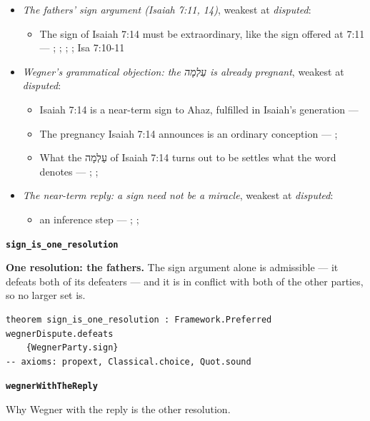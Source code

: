 \documentclass[11pt]{article}
\begin{document}
\begin{itemize}
\item \emph{The fathers' sign argument (Isaiah 7:11, 14)}, weakest at \emph{disputed}:
\begin{itemize}
\item The sign of Isaiah 7:14 must be extraordinary, like the sign offered at 7:11 --- \cite[I.35]{origen-against-celsus-248}; \cite[84]{justin-dialogue-with-trypho-160}; \cite[III.21.6]{irenaeus-against-heresies-180}; \cite[474]{postell-isaiah-messianic-2025}; Isa 7:10-11
\end{itemize}
\item \emph{Wegner's grammatical objection: the עַלְמָה is already pregnant}, weakest at \emph{disputed}:
\begin{itemize}
\item Isaiah 7:14 is a near-term sign to Ahaz, fulfilled in Isaiah's generation --- \cite{brown-birth-messiah-1993}
\item The pregnancy Isaiah 7:14 announces is an ordinary conception --- \cite[476--478]{wegner-virgin-births-2011}; \cite[474]{postell-isaiah-messianic-2025}
\item What the עַלְמָה of Isaiah 7:14 turns out to be settles what the word denotes --- \cite[471--472]{wegner-virgin-births-2011}; \cite[468]{postell-isaiah-messianic-2025}; \cite[152]{rico-gentry-infant-king-2020}
\end{itemize}
\item \emph{The near-term reply: a sign need not be a miracle}, weakest at \emph{disputed}:
\begin{itemize}
\item an inference step --- \cite[64--65]{rhodea-did-matthew-conceive-2013}; \cite[469--470]{wegner-virgin-births-2011}; \cite[474]{postell-isaiah-messianic-2025}
\end{itemize}
\end{itemize}
\par\medskip\noindent\textbf{\texttt{sign\_\allowbreak{}is\_\allowbreak{}one\_\allowbreak{}resolution}}\par\nobreak\noindent
\textbf{One resolution: the fathers.} The sign argument alone is admissible — it defeats both of its defeaters — and it is in conflict with both of the other parties, so no larger set is.

{\small\begin{verbatim}
theorem sign_is_one_resolution : Framework.Preferred wegnerDispute.defeats
    {WegnerParty.sign}
-- axioms: propext, Classical.choice, Quot.sound
\end{verbatim}}
\par\medskip\noindent\textbf{\texttt{wegner\allowbreak{}With\allowbreak{}The\allowbreak{}Reply}}\par\nobreak\noindent
Why Wegner with the reply is the other resolution.
\end{document}

